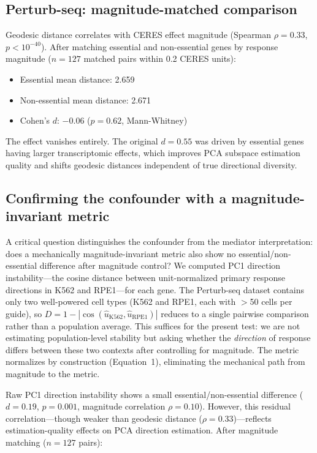 \documentclass[11pt]{article}
\begin{document}
\subsection{Perturb-seq: magnitude-matched comparison}

Geodesic distance correlates with CERES effect magnitude (Spearman $\rho
= 0.33$, $p < 10^{-40}$). After matching essential and non-essential
genes by response magnitude ($n = 127$ matched pairs within 0.2 CERES
units):

\begin{itemize}
  \item Essential mean distance: 2.659
  \item Non-essential mean distance: 2.671
  \item Cohen's $d$: $-0.06$ ($p = 0.62$, Mann-Whitney)
\end{itemize}

The effect vanishes entirely. The original $d = 0.55$ was driven by
essential genes having larger transcriptomic effects, which improves PCA
subspace estimation quality and shifts geodesic distances independent of
true directional diversity.

\subsection{Confirming the confounder with a magnitude-invariant metric}

A critical question distinguishes the confounder from the mediator
interpretation: does a mechanically magnitude-invariant metric also show
no essential/non-essential difference after magnitude control? We
computed PC1 direction instability---the cosine distance between
unit-normalized primary response directions in K562 and RPE1---for each
gene. The Perturb-seq dataset contains only two well-powered cell types
(K562 and RPE1, each with $>$50 cells per guide), so $D = 1 -
|\cos(\hat{u}_{\text{K562}}, \hat{u}_{\text{RPE1}})|$ reduces to a
single pairwise comparison rather than a population average. This
suffices for the present test: we are not estimating population-level
stability but asking whether the \emph{direction} of response differs
between these two contexts after controlling for magnitude. The metric
normalizes by construction (Equation~1), eliminating the mechanical path
from magnitude to the metric.

Raw PC1 direction instability shows a small essential/non-essential
difference ($d = 0.19$, $p = 0.001$, magnitude correlation $\rho =
0.10$). However, this residual correlation---though weaker than geodesic
distance ($\rho = 0.33$)---reflects estimation-quality effects on PCA
direction estimation. After magnitude matching ($n = 127$ pairs):
\end{document}
